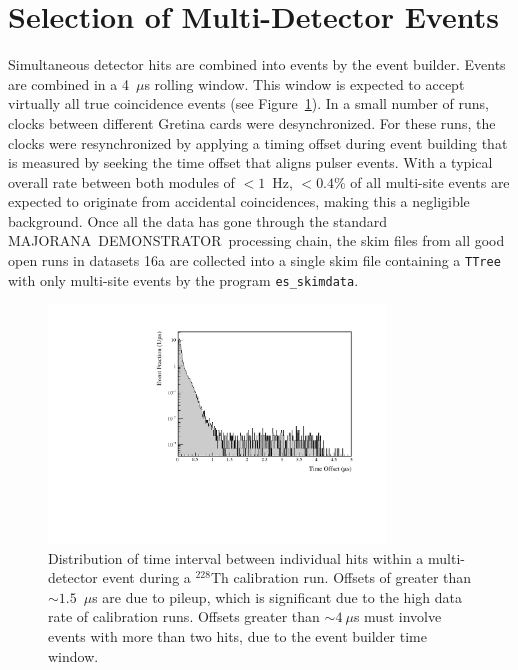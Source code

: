 \documentclass[notitlepage,rmp,aps,10pt]{revtex4-1}
\newcommand{\MJ}{M{\footnotesize AJORANA}}
\newcommand{\Demo}{D{\footnotesize EMON\-STRAT\-OR}}
\newcommand{\MJD}{\MJ\ \Demo}
\newcommand{\iso}[2]{$^{#1}$#2}
\newcommand{\Th}[1]{\iso{#1}{Th}}
\begin{document}
\section{Selection of Multi-Detector Events}
Simultaneous detector hits are combined into events by the event builder.
Events are combined in a 4~$\mu$s rolling window.
This window is expected to accept virtually all true coincidence events (see Figure~\ref{fig:toffset}).
In a small number of runs, clocks between different Gretina cards were desynchronized.
For these runs, the clocks were resynchronized by applying a timing offset during event building that is measured by seeking the time offset that aligns pulser events.
With a typical overall rate between both modules of $<1$~Hz, $<0.4\%$ of all multi-site events are expected to originate from accidental coincidences, making this a negligible background.
Once all the data has gone through the standard \MJD\ processing chain, the skim files from all good open runs in datasets 1\-6a are collected into a single skim file containing a \texttt{TTree} with only multi-site events by the program \texttt{es\_skimdata}.

\begin{figure}[ht]
  \centering
  \includegraphics[width=0.8\textwidth]{toffset}
  \caption[Distribution of offset times within multi-detector events]{\label{fig:toffset}
    Distribution of time interval between individual hits within a multi-detector event during a \Th{228} calibration run. Offsets of greater than ${\sim}1.5$~$\mu$s are due to pileup, which is significant due to the high data rate of calibration runs. Offsets greater than ${\sim}4~\mu$s must involve events with more than two hits, due to the event builder time window.}
\end{figure}
\end{document}
